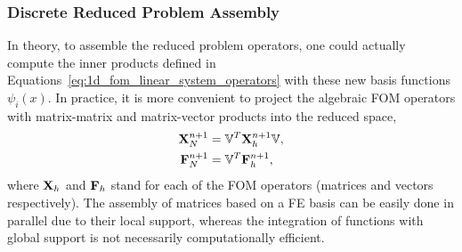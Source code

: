 \documentclass[../../thesis.tex]{subfiles}
\newcommand{\rbV}{\ensuremath{\mathbb{V}}}
\newcommand{\rbVT}{\ensuremath{\rbV^T}}
\begin{document}
\subsubsection{Discrete Reduced Problem Assembly}
In theory, to assemble the reduced problem operators, 
one could actually compute the inner products defined in Equations~\eqref{eq:1d_fom_linear_system_operators} 
with these new basis functions $\psi_i(x)$.
In practice, it is more convenient to project the algebraic FOM operators with \mbox{matrix-matrix} and \mbox{matrix-vector} products into the reduced space, 
\begin{subequations}
    \label{eq:1d_rom_linear_system_operators}
    \begin{align}
        \vb{X}_{N}^{n+1}       &= \rbVT \vb{X}_{h}^{n+1} \rbV, \\
        \vb{F}_{N}^{n+1}       &= \rbVT \vb{F}_{h}^{n+1}, 
    \end{align}
\end{subequations}
where $\vb{X}_{h}$ and $\vb{F}_{h}$ stand for each of the FOM operators (matrices and vectors respectively).
The assembly of matrices based on a FE basis can be easily done in parallel due to their local support, 
whereas the integration of functions with global support is not necessarily computationally efficient.
\end{document}

